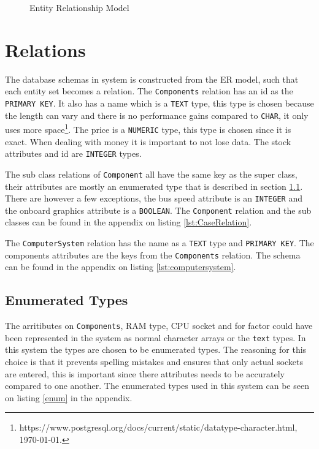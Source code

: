 \documentclass[12pt,a4paper]{article}
\begin{document}
\begin{figure}[!htbp]
    \centering
    
    \caption{Entity Relationship Model}
    \label{fig:er}
\end{figure}

\section{Relations}
The database schemas in system is constructed from the ER model, such that each entity set becomes a relation.
The \texttt{Components} relation has an id as the \texttt{PRIMARY KEY}. 
It also has a name which is a \texttt{TEXT} type, this type is chosen because the length can vary and there is no performance gains compared to \texttt{CHAR}, it only uses more space\footnote{https://www.postgresql.org/docs/current/static/datatype-character.html, \today.}.
The price is a \texttt{NUMERIC} type, this type is chosen since it is exact. When dealing with money it is important to not lose data.
The stock attributes and id are \texttt{INTEGER} types.

The sub class relations of \texttt{Component} all have the same key as the super class, their attributes are mostly an enumerated type that is described in section \ref{sec:enum}. 
There are however a few exceptions, the bus speed attribute is an \texttt{INTEGER} and the onboard graphics attribute is a \texttt{BOOLEAN}. The \texttt{Component} relation and the sub classes can be found in the appendix on listing \ref{lst:CaseRelation}.

The \texttt{ComputerSystem} relation has the name as a \texttt{TEXT} type and \texttt{PRIMARY KEY}. The components attributes are the keys from the \texttt{Components} relation. The schema can be found in the appendix on listing \ref{lst:computersystem}. 

\subsection{Enumerated Types}
\label{sec:enum}
The arritibutes on \texttt{Components}, RAM type, CPU socket and for factor could have been represented in the system as normal character arrays or the \texttt{text} types. 
In this system the types are chosen to be enumerated types.
The reasoning for this choice is that it prevents spelling mistakes and ensures that only actual sockets are entered, this is important since there attributes needs to be accurately compared to one another.
The enumerated types used in this system can be seen on listing \ref{enum} in the appendix.
\end{document}
